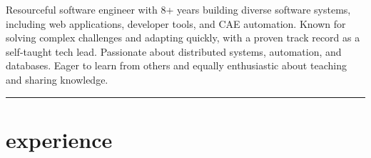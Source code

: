 \documentclass{mycv}
\begin{document}
\header{\phone}{\github}{\email}{\linkedin}

\begin{objective}
    Resourceful software engineer with 8+ years building diverse software systems, including web applications, developer tools, and CAE automation.
    Known for solving complex challenges and adapting quickly, with a proven track record as a self-taught tech lead.
    Passionate about distributed systems, automation, and databases.
    Eager to learn from others and equally enthusiastic about teaching and sharing knowledge.
\end{objective}

\vspace{-\parskip}\noindent\rule{\textwidth}{0.4pt}

\section{experience}
\end{document}
